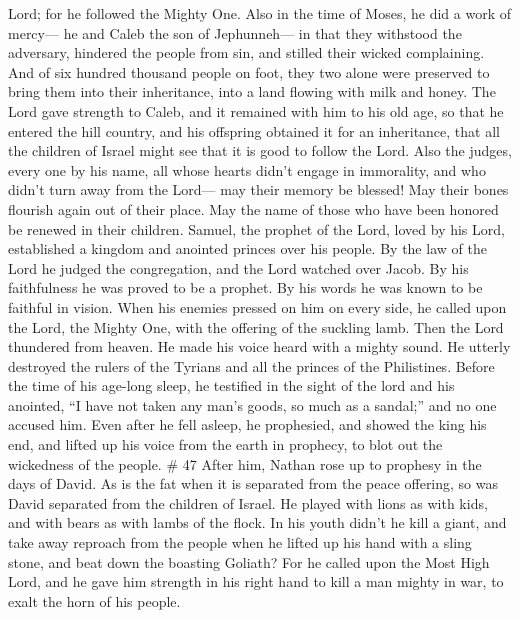 Lord; for he followed the Mighty One.  Also in the time of
Moses, he did a work of mercy--- he and Caleb the son of Jephunneh--- in
that they withstood the adversary, hindered the people from sin, and
stilled their wicked complaining.  And of six hundred
thousand people on foot, they two alone were preserved to bring them
into their inheritance, into a land flowing with milk and honey.
 The Lord gave strength to Caleb, and it remained with him
to his old age, so that he entered the hill country, and his offspring
obtained it for an inheritance,  that all the children of
Israel might see that it is good to follow the Lord.  Also
the judges, every one by his name, all whose hearts didn't engage in
immorality, and who didn't turn away from the Lord--- may their memory
be blessed!  May their bones flourish again out of their
place. May the name of those who have been honored be renewed in their
children.  Samuel, the prophet of the Lord, loved by his
Lord, established a kingdom and anointed princes over his people.
 By the law of the Lord he judged the congregation, and the
Lord watched over Jacob.  By his faithfulness he was proved
to be a prophet. By his words he was known to be faithful in vision.
 When his enemies pressed on him on every side, he called
upon the Lord, the Mighty One, with the offering of the suckling lamb.
 Then the Lord thundered from heaven. He made his voice
heard with a mighty sound.  He utterly destroyed the rulers
of the Tyrians and all the princes of the Philistines. 
Before the time of his age-long sleep, he testified in the sight of the
lord and his anointed, ``I have not taken any man's goods, so much as a
sandal;'' and no one accused him.  Even after he fell
asleep, he prophesied, and showed the king his end, and lifted up his
voice from the earth in prophecy, to blot out the wickedness of the
people. \# 47  After him, Nathan rose up to prophesy in the
days of David.  As is the fat when it is separated from the
peace offering, so was David separated from the children of Israel.
 He played with lions as with kids, and with bears as with
lambs of the flock.  In his youth didn't he kill a giant,
and take away reproach from the people when he lifted up his hand with a
sling stone, and beat down the boasting Goliath?  For he
called upon the Most High Lord, and he gave him strength in his right
hand to kill a man mighty in war, to exalt the horn of his people.
